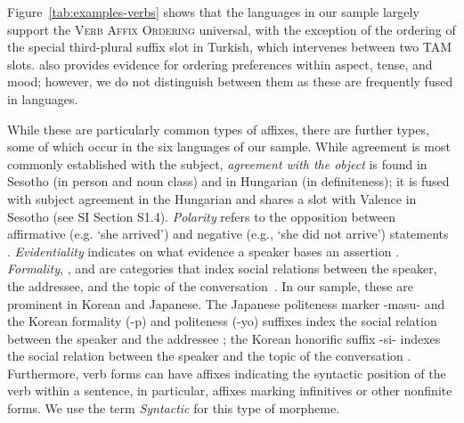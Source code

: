 \documentclass[11pt,letterpaper]{article}
\newcommand{\citep}{\parencite}
\newcommand{\citet}{\Textcite}
\newcounter{def}
\begin{document}

Figure~\ref{tab:examples-verbs} shows that the languages in our sample largely support the \textsc{Verb Affix Ordering} universal, with the exception of the ordering of the special third-plural suffix slot in Turkish, which intervenes between two TAM slots.
\citet{bybee-morphology-1985} also provides evidence for ordering preferences within aspect, tense, and mood; however, we do not distinguish between them as these are frequently fused in languages.


While these are particularly common types of affixes, there are further types, some of which occur in the six languages of our sample.
While agreement is most commonly established with the subject, \textit{agreement with the object} is found in Sesotho \citep{doke1967textbook} (in person and noun class) and in Hungarian \citep{rounds2001hungarian} (in definiteness); it is fused with subject agreement in the Hungarian and shares a slot with Valence in Sesotho (see SI Section S1.4).
\textit{Polarity} refers to the opposition between affirmative (e.g. `she arrived') and negative  (e.g., `she did not arrive') statements \citep{wals-112}.
\textit{Evidentiality} indicates on what evidence a speaker bases an assertion \citep{aikhenvald2003evidentiality}.
\textit{Formality}, , and  are categories that index social relations between the speaker, the addressee, and the topic of the conversation~\citep{hasegawa2014japanese, yeon2010korean}.
In our sample, these are prominent in Korean and Japanese.
The Japanese politeness marker -masu- and the Korean formality (-p) and politeness (-yo) suffixes index the social relation between the speaker and the addressee \citep{hasegawa2014japanese, yeon2010korean}; the Korean honorific suffix -si- indexes the social relation between the speaker and the topic of the conversation \citep{yeon2010korean}.
Furthermore, verb forms can have affixes indicating the syntactic position of the verb within a sentence, in particular, affixes marking infinitives or other nonfinite forms.
We use the term \textit{Syntactic} for this type of morpheme.
\end{document}
